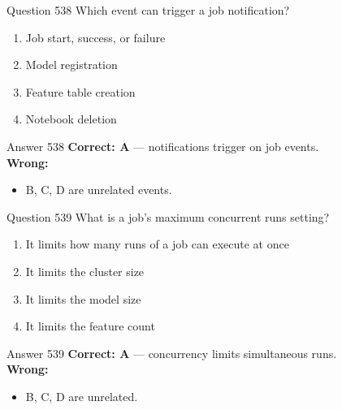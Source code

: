 \documentclass[aspectratio=169,11pt]{beamer}
\begin{document}
	\begin{frame}{Question 538}
		Which event can trigger a job notification?
		\begin{enumerate}[label=\Alph*.]
			\item Job start, success, or failure
			\item Model registration
			\item Feature table creation
			\item Notebook deletion
		\end{enumerate}
	\end{frame}
	\begin{frame}{Answer 538}
		\textbf{Correct: A} --- notifications trigger on job events.\\
		\vspace{0.5em}
		\textbf{Wrong:}
		\begin{itemize}
			\item B, C, D are unrelated events.
		\end{itemize}
	\end{frame}
	
	\begin{frame}{Question 539}
		What is a job's maximum concurrent runs setting?
		\begin{enumerate}[label=\Alph*.]
			\item It limits how many runs of a job can execute at once
			\item It limits the cluster size
			\item It limits the model size
			\item It limits the feature count
		\end{enumerate}
	\end{frame}
	\begin{frame}{Answer 539}
		\textbf{Correct: A} --- concurrency limits simultaneous runs.\\
		\vspace{0.5em}
		\textbf{Wrong:}
		\begin{itemize}
			\item B, C, D are unrelated.
		\end{itemize}
	\end{frame}
	
\end{document}
